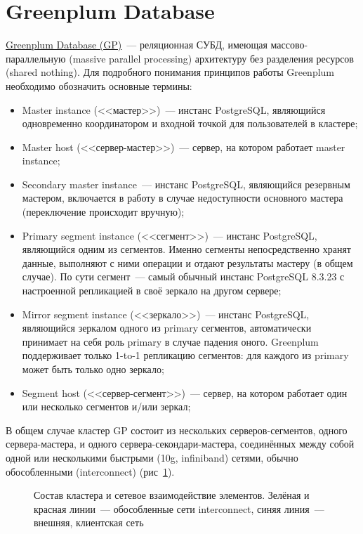 \section{Greenplum Database}
\label{sec:greenplum}

\href{http://greenplum.org/}{Greenplum Database (GP)}~--- реляционная СУБД, имеющая массово-параллельную (massive parallel processing) архитектуру без разделения ресурсов (shared nothing). Для подробного понимания принципов работы Greenplum необходимо обозначить основные термины:

\begin{itemize}
  \item Master instance (<<мастер>>)~--- инстанс PostgreSQL, являющийся одновременно координатором и входной точкой для пользователей в кластере;
  \item Master host (<<сервер-мастер>>)~--- сервер, на котором работает master instance;
  \item Secondary master instance~--- инстанс PostgreSQL, являющийся резервным мастером, включается в работу в случае недоступности основного мастера (переключение происходит вручную);
  \item Primary segment instance (<<сегмент>>)~--- инстанс PostgreSQL, являющийся одним из сегментов. Именно сегменты непосредственно хранят данные, выполняют с ними операции и отдают результаты мастеру (в общем случае). По сути сегмент~--- самый обычный инстанс PostgreSQL 8.3.23 с настроенной репликацией в своё зеркало на другом сервере;
  \item Mirror segment instance (<<зеркало>>)~--- инстанс PostgreSQL, являющийся зеркалом одного из primary сегментов, автоматически принимает на себя роль primary в случае падения оного. Greenplum поддерживает только 1-to-1 репликацию сегментов: для каждого из primary может быть только одно зеркало;
  \item Segment host (<<сервер-сегмент>>)~--- сервер, на котором работает один или несколько сегментов и/или зеркал;
\end{itemize}

В общем случае кластер GP состоит из нескольких серверов-сегментов, одного сервера-мастера, и одного сервера-секондари-мастера, соединённых между собой одной или несколькими быстрыми (10g, infiniband) сетями, обычно обособленными (interconnect) (рис~\ref{fig:greenplum_arch1}).

\begin{figure}[h!]
  \caption{Состав кластера и сетевое взаимодействие элементов. Зелёная и красная линии~--- обособленные сети interconnect, синяя линия~--- внешняя, клиентская сеть}
  \label{fig:greenplum_arch1}
\end{figure}


